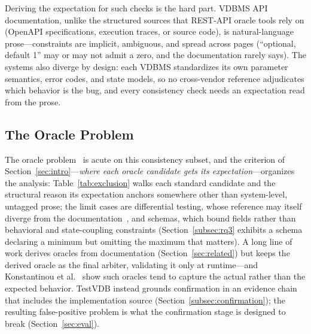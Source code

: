 \documentclass[acmsmall,screen,review,anonymous]{acmart}
\newcommand{\system}{TestVDB}
\begin{document}
Deriving the expectation for such checks is the hard part. VDBMS API documentation, unlike the structured sources that REST-API oracle tools rely on (OpenAPI specifications, execution traces, or source code), is natural-language prose---constraints are implicit, ambiguous, and spread across pages (``optional, default 1'' may or may not admit a zero, and the documentation rarely says). The systems also diverge by design: each VDBMS standardizes its own parameter semantics, error codes, and state models, so no cross-vendor reference adjudicates which behavior is the bug, and every consistency check needs an expectation read from the prose.

\subsection{The Oracle Problem}
\label{subsec:oracle}

The oracle problem~\cite{barr15} is acute on this consistency subset, and the criterion of Section~\ref{sec:intro}---\emph{where each oracle candidate gets its expectation}---organizes the analysis: Table~\ref{tab:exclusion} walks each standard candidate and the structural reason its expectation anchors somewhere other than system-level, untagged prose; the limit cases are differential testing, whose reference may itself diverge from the documentation~\cite{roadmap25}, and schemas, which bound fields rather than behavioral and state-coupling constraints (Section~\ref{subsec:rq3} exhibits a schema declaring a minimum but omitting the maximum that matters). A long line of work derives oracles from documentation (Section~\ref{sec:related}) but keeps the derived oracle as the final arbiter, validating it only at runtime---and Konstantinou et al.~\cite{konstantinou24} show such oracles tend to capture the actual rather than the expected behavior. \system{} instead grounds confirmation in an evidence chain that includes the implementation source (Section~\ref{subsec:confirmation}); the resulting false-positive problem is what the confirmation stage is designed to break (Section~\ref{sec:eval}).
\end{document}
